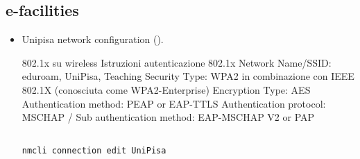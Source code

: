 \subsection{e-facilities}

\begin{itemize}
\item Unipisa network configuration ().

802.1x su wireless
Istruzioni autenticazione 802.1x
    Network Name/SSID: eduroam, UniPisa, Teaching
    Security Type: WPA2 in combinazione con  IEEE 802.1X (conosciuta come WPA2-Enterprise)
    Encryption Type: AES
    Authentication method: PEAP or EAP-TTLS
    Authentication protocol: MSCHAP / Sub authentication method: EAP-MSCHAP V2 or PAP
    
\begin{lstlisting}[basicstyle=\small\ttfamily,columns=flexible,breaklines=true]

nmcli connection edit UniPisa


\end{lstlisting}
\end{itemize}
